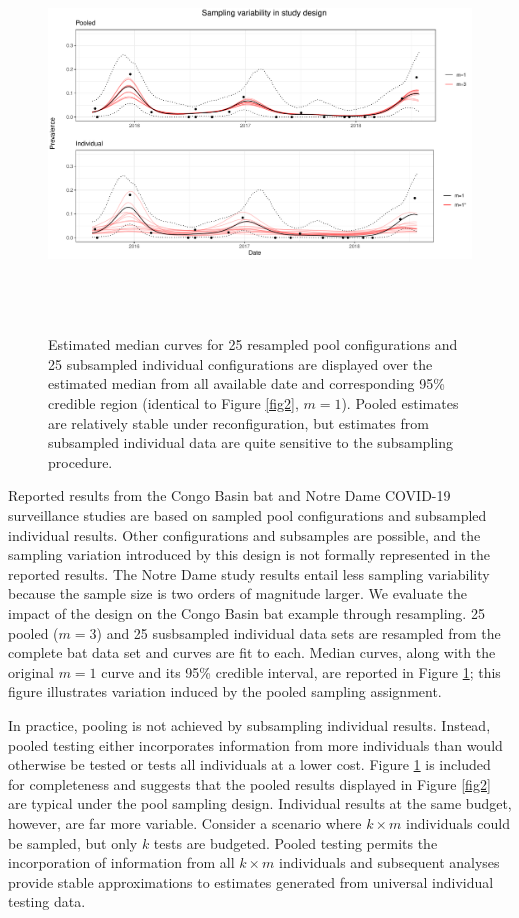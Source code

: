 \documentclass{article}
\begin{document}
\begin{figure}[h]
\centerline{\includegraphics[width=500pt,height=296pt]{Figure4.pdf}}
\caption{Estimated median curves for 25 resampled pool configurations and 25 subsampled individual configurations are displayed over the estimated median from all available date and corresponding 95\% credible region (identical to Figure \ref{fig2}, $m=1$). Pooled estimates are relatively stable under reconfiguration, but estimates from subsampled individual data are quite sensitive to the subsampling procedure. \label{fig4}}
\end{figure}

Reported results from the Congo Basin bat and Notre Dame COVID-19 surveillance studies are based on sampled pool configurations and subsampled individual results. Other configurations and subsamples are possible, and the sampling variation introduced by this design is not formally represented in the reported results. The Notre Dame study results entail less sampling variability because the sample size is two orders of magnitude larger. We evaluate the impact of the design on the Congo Basin bat example through resampling. 25 pooled ($m=3$) and 25 susbsampled individual data sets are resampled from the complete bat data set and curves are fit to each. Median curves, along with the original $m=1$ curve and its 95\% credible interval, are reported in Figure \ref{fig4}; this figure illustrates variation induced by the pooled sampling assignment. 

In practice, pooling is not achieved by subsampling individual results. Instead, pooled testing either incorporates information from more individuals than would otherwise be tested or tests all individuals at a lower cost. Figure \ref{fig4} is included for completeness and suggests that the pooled results displayed in Figure \ref{fig2} are typical under the pool sampling design. Individual results at the same budget, however, are far more variable. Consider a scenario where $k\times m$ individuals could be sampled, but only $k$ tests are budgeted. Pooled testing permits the incorporation of information from all $k\times m$ individuals and subsequent analyses provide stable approximations to estimates generated from universal individual testing data. 
\end{document}

